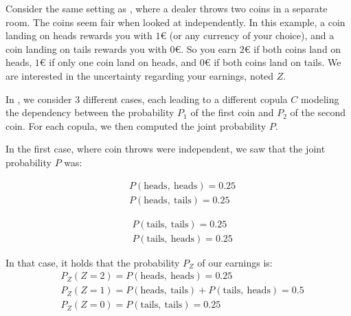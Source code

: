 \begin{example}\label{ex:propagated_probability}
    Consider the same setting as , where a dealer throws two coins in a separate room. The coins seem fair when looked at independently. In this example, a coin landing on heads rewards you with $1$€ (or any currency of your choice), and a coin landing on tails rewards you with $0$€. So you earn $2$€ if both coins land on heads, $1$€ if only one coin land on heads, and $0$€ if both coins land on tails. We are interested in the uncertainty regarding your earnings, noted $Z$.
    
    In , we consider $3$ different cases, each leading to a different copula $C$ modeling the dependency between the probability $P_1$ of the first coin and $P_2$ of the second coin. For each copula, we then computed the joint probability $P$.
    
    In the first case, where coin throws were independent, we saw that the joint probability $P$ was:\\
    \begin{minipage}[b]{0.5\linewidth}
    \begin{align*}
        & P(\text{heads}, ~\text{heads}) = 0.25\\
        & P(\text{heads}, ~\text{tails}) = 0.25
    \end{align*}
    \end{minipage}
    \begin{minipage}[b]{0.5\linewidth}
    \begin{align*}
        & P(\text{tails}, ~\text{tails}) = 0.25 \\
        & P(\text{tails}, ~\text{heads}) = 0.25
    \end{align*}
    \end{minipage}
    In that case, it holds that the probability $P_Z$ of our earnings is:
    \begin{align*}
        & P_Z(Z=2) = P(\text{heads}, ~\text{heads}) = 0.25\\
        & P_Z(Z=1) = P(\text{heads}, ~\text{tails}) + P(\text{tails}, ~\text{heads}) = 0.5 \\
        & P_Z(Z=0) = P(\text{tails}, ~\text{tails}) = 0.25
    \end{align*}
    

\end{example}

